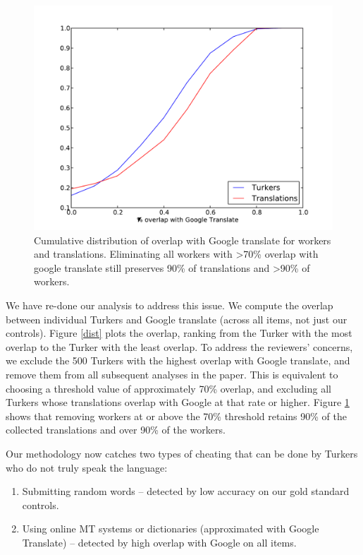 \documentclass[11pt]{article}
\begin{document}
\begin{figure}[h]
\centering
\includegraphics[width=\linewidth]{figures/google-cdf-googlangs.pdf}
\caption{Cumulative distribution of overlap with Google translate for workers and translations. Eliminating all workers with \textgreater 70\% overlap with google translate still preserves 90\% of translations and \textgreater 90\% of workers.}
\label{cdf}
\end{figure}

We have re-done our analysis to address this issue.  We compute the overlap between individual Turkers and Google translate (across all items, not just our controls).   Figure \ref{dist} plots the overlap, ranking from the Turker with the most overlap to the Turker with the least overlap.  To address the reviewers' concerns, we exclude the 500 Turkers with the highest overlap with Google translate, and remove them from all subsequent analyses in the paper.  This is equivalent to choosing a threshold value of approximately 70\% overlap, and excluding all Turkers whose translations overlap with Google at that rate or higher.  
Figure \ref{cdf} shows that removing workers at or above the 70\% threshold retains 90\% of the collected translations and over 90\% of the workers.

Our methodology now catches two types of cheating that can be done by Turkers who do not truly speak the language: 
\begin{enumerate}
\item Submitting random words -- detected by low accuracy on our gold standard controls.
\item Using online MT systems or dictionaries (approximated with Google Translate) -- detected by high overlap with Google on all items.
\end{enumerate}
\end{document}
